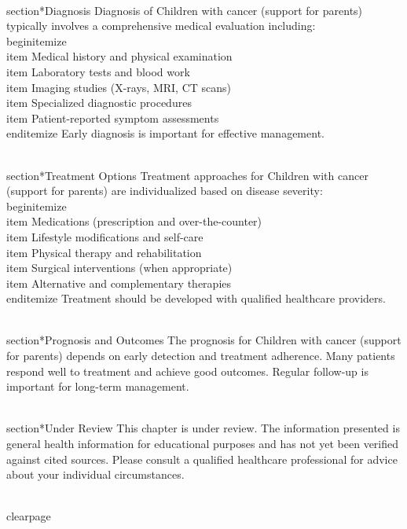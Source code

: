 \\section*{Diagnosis}
Diagnosis of Children with cancer (support for parents) typically involves a comprehensive medical evaluation including:
\\begin{itemize}
  \\item Medical history and physical examination
  \\item Laboratory tests and blood work
  \\item Imaging studies (X-rays, MRI, CT scans)
  \\item Specialized diagnostic procedures
  \\item Patient-reported symptom assessments
\\end{itemize}
Early diagnosis is important for effective management.

\\section*{Treatment Options}
Treatment approaches for Children with cancer (support for parents) are individualized based on disease severity:
\\begin{itemize}
  \\item Medications (prescription and over-the-counter)
  \\item Lifestyle modifications and self-care
  \\item Physical therapy and rehabilitation
  \\item Surgical interventions (when appropriate)
  \\item Alternative and complementary therapies
\\end{itemize}
Treatment should be developed with qualified healthcare providers.

\\section*{Prognosis and Outcomes}
The prognosis for Children with cancer (support for parents) depends on early detection and treatment adherence. Many patients respond well to treatment and achieve good outcomes. Regular follow-up is important for long-term management.

\\section*{Under Review}
This chapter is under review. The information presented is general health information for educational purposes and has not yet been verified against cited sources. Please consult a qualified healthcare professional for advice about your individual circumstances.

\\clearpage
